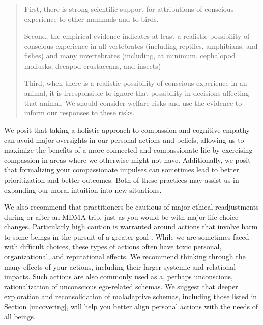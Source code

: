 \documentclass[12pt,letterpaper]{book}
\begin{document}
\begin{quotation}
    First, there is strong scientific support for attributions of conscious experience to other mammals and to birds.
    
    Second, the empirical evidence indicates at least a realistic possibility of conscious experience in all vertebrates (including reptiles, amphibians, and fishes) and many invertebrates (including, at minimum, cephalopod mollusks, decapod crustaceans, and insects)

    Third, when there is a realistic possibility of conscious experience in an animal, it is irresponsible to ignore that possibility in decisions affecting that animal. We should consider welfare risks and use the evidence to inform our responses to these risks.
\end{quotation}

We posit that taking a holistic approach to compassion and cognitive empathy can avoid major oversights in our personal actions and beliefs, allowing us to maximize the benefits of a more connected and compassionate life by exercising compassion in areas where we otherwise might not have. Additionally, we posit that formalizing your compassionate impulses can sometimes lead to better prioritization and better outcomes. Both of these practices may assist us in expanding our moral intuition into new situations.

We also recommend that practitioners be cautious of major ethical readjustments during or after an MDMA trip, just as you would be with major life choice changes. Particularly high caution is warranted around actions that involve harm to some beings in the pursuit of a greater goal \cite{askellSelfServing}. While we are sometimes faced with difficult choices, these types of actions often have toxic personal, organizational, and reputational effects. We recommend thinking through the many effects of your actions, including their larger systemic and relational impacts. Such actions are also commonly used as a, perhaps unconscious, rationalization of unconscious ego-related schemas. We suggest that deeper exploration and reconsolidation of maladaptive schemas, including those listed in Section \ref{uncovering}, will help you better align personal actions with the needs of all beings.
\end{document}
